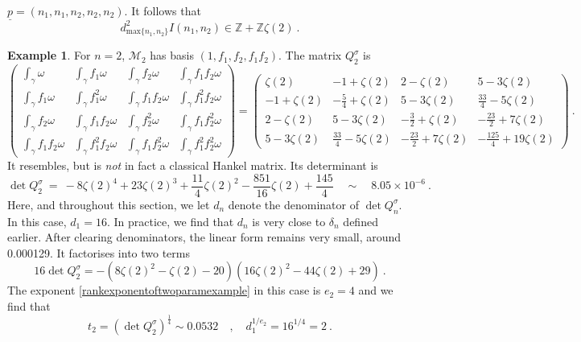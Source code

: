 \documentclass[a4paper,10pt]{amsart}
\theoremstyle{definition}
\newtheorem{example}[thm]{Example}
\theoremstyle{remark}
\numberwithin{equation}{section}
\newcommand{\Z}{\mathbb Z}
\newcommand{\0}{\color{blue}{\mathsf{0}}}
\begin{document}
  $  \underline{p} =  ( n_1,n_1,n_2,n_2,n_2)$. 
    It follows that 
    \begin{equation} \label{DenomboundforIn1n2}  d^2_{\mathrm{max}\{n_1,n_2\}} I(n_1,n_2) \in \Z + \Z \zeta(2) \ .
    \end{equation} 
    \begin{example} For $n=2$,  $\mathcal{M}_2 $ has basis $(1,f_1,f_2,f_{1}f_2)$. The matrix $Q^{\sigma}_{2}$ is
\[   \begin{pmatrix}
\int_{\gamma} \omega & \int_{\gamma} f_1 \omega & \int_{\gamma} f_2 \omega & \int_{\gamma} f_1 f_2 \omega \\[6pt]
\int_{\gamma} f_1 \omega & \int_{\gamma} f^2_1 \omega & \int_{\gamma} f_1f_2 \omega & \int_{\gamma} f^2_1 f_2 \omega \\[6pt]
\int_{\gamma}f_2 \omega & \int_{\gamma} f_1 f_2\omega & \int_{\gamma} f^2_2 \omega & \int_{\gamma} f_1 f^2_2 \omega \\[6pt]
\int_{\gamma}f_1 f_2  \omega & \int_{\gamma} f^2_1f_2 \omega & \int_{\gamma} f_1f^2_2 \omega & \int_{\gamma} f^2_1 f^2_2 \omega 
\end{pmatrix}   = \begin{pmatrix}
\zeta(2)  &-1+ \zeta(2) & 2- \zeta(2) & 5-3  \zeta(2)  \\[6pt]
-1+  \zeta(2) &  - \frac{5}{4} + \zeta(2) & 5-3\zeta(2) &  \frac{33}{4}- 5  \zeta(2)  \\[6pt]
2- \zeta(2) &5-3\zeta(2) &   -\frac{3}{2}+  \zeta(2)  &  -  \frac{23}{2} + 7 \zeta(2)  \\[6pt]
5-3\zeta(2) &  \frac{33}{4}- 5  \zeta(2)  &-  \frac{23}{2} + 7 \zeta(2)    & - \frac{125}{4} +19 \zeta(2)
\end{pmatrix}   \ . \]
It resembles, but  is  \emph{not}  in fact a classical Hankel matrix. Its determinant is 
\[ \det Q^{\sigma}_{2} \  =  \ - 8 \zeta(2)^4 + 23 \zeta(2)^3 + \frac{11}{4} \zeta(2)^2 - \frac{851}{16} \zeta(2) + \frac{145}{4}  \quad \sim \quad   8.05 \times 10^{-6} \ . \]
 Here, and throughout this section, we let $d_n$ denote the denominator of $\det Q^{\sigma}_{n}$.  In this case, $d_1=16$. 
 In practice, we find that $d_n$ is very close to  $\delta_n$ defined earlier. 
  After clearing denominators, the linear form remains very small, around 0.000129. It factorises into two terms 
\begin{equation} \label{detFactorsf1f2} 16 \det Q^{\sigma}_2 = -  (8 \zeta(2)^2 - \zeta(2) -20) ( 16 \zeta(2)^2 -44 \zeta(2) +29) \ .\end{equation}
The exponent \eqref{rankexponentoftwoparamexample} in this case is $e_2 =4$ and we find that
\[  t_2= (\det Q^{\sigma}_2)^{\frac{1}{4}} \sim  0.0532 \quad , \quad    d^{1/e_2}_1=   16^{1/4}= 2\ . \]
  \end{example} 
  
\end{document}
